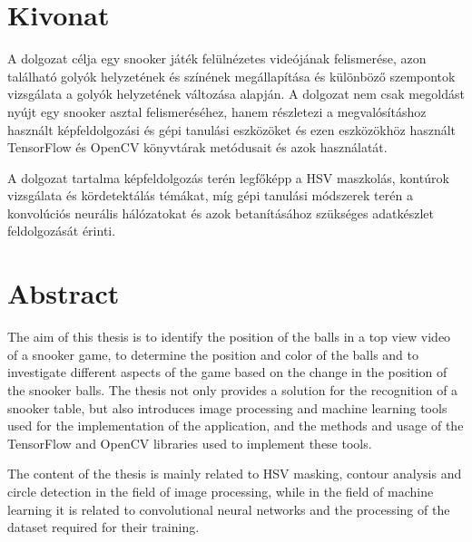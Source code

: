 \setcounter{page}{1}

\selecthungarian

\chapter*{Kivonat}

A dolgozat célja egy snooker játék felülnézetes videójának felismerése, azon található golyók helyzetének és színének megállapítása és különböző szempontok vizsgálata a golyók helyzetének változása alapján. A dolgozat nem csak megoldást nyújt egy snooker asztal felismeréséhez, hanem részletezi a megvalósításhoz használt képfeldolgozási és gépi tanulási eszközöket és ezen eszközökhöz használt TensorFlow és OpenCV könyvtárak metódusait és azok használatát.
\par A dolgozat tartalma képfeldolgozás terén legfőképp a HSV maszkolás, kontúrok vizsgálata és kördetektálás témákat, míg gépi tanulási módszerek terén a konvolúciós neurális hálózatokat és azok betanításához szükséges adatkészlet feldolgozását érinti.


\vfill
\selectenglish


\chapter*{Abstract}

The aim of this thesis is to identify the position of the balls in a top view video of a snooker game, to determine the position and color of the balls and to investigate different aspects of the game based on the change in the position of the snooker balls. The thesis not only provides a solution for the recognition of a snooker table, but also introduces image processing and machine learning tools used for the implementation of the application, and the methods and usage of the TensorFlow and OpenCV libraries used to implement these tools.
\par The content of the thesis is mainly related to HSV masking, contour analysis and circle detection in the field of image processing, while in the field of machine learning it is related to convolutional neural networks and the processing of the dataset required for their training.

\vfill
\selectthesislanguage

\setcounter{romanPage}{\value{page}}
